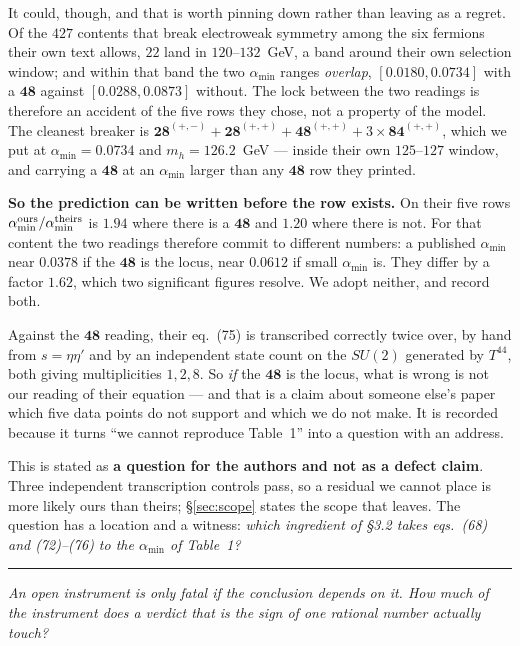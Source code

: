 \documentclass[11pt,a4paper]{article}
\newcommand{\su}[1]{SU(#1)}
\newcommand{\rep}[1]{\mathbf{#1}}
\newcommand{\amin}{\alpha_{\min}}
\newcommand{\bridge}[1]{\par\medskip\noindent
  \textcolor{hdrblue!45}{\rule{2.2cm}{0.6pt}}\;\;\parbox[t]{0.84\textwidth}{\small\itshape
  \textcolor{hdrblue!85}{#1}}\par\medskip}
\newenvironment{keyeq}
  {\begin{center}\setlength{\fboxsep}{9pt}\setlength{\fboxrule}{0.8pt}%
   \begin{lrbox}{\keyeqbox}\begin{minipage}{0.88\textwidth}}
  {\end{minipage}\end{lrbox}%
   \fcolorbox{hdrblue!55}{hdrblue!6}{\usebox{\keyeqbox}}\end{center}}
\begin{document}
It could, though, and that is worth pinning down rather than leaving as a regret. Of the $427$
contents that break electroweak symmetry among the six fermions their own text allows, $22$ land in
$120$--$132$~GeV, a band around their own selection window; and within that band the two $\amin$
ranges \emph{overlap}, $[0.0180,0.0734]$ with a $\rep{48}$ against $[0.0288,0.0873]$ without. The
lock between the two readings is therefore an accident of the five rows they chose, not a property
of the model. The cleanest breaker is
$\rep{28}^{(+,-)}+\rep{28}^{(+,+)}+\rep{48}^{(+,+)}+3\times\rep{84}^{(+,+)}$, which we put at
$\amin=0.0734$ and $m_h=126.2$~GeV --- inside their own $125$--$127$ window, and carrying a
$\rep{48}$ at an $\amin$ larger than any $\rep{48}$ row they printed.

\begin{keyeq}
\textbf{So the prediction can be written before the row exists.} On their five rows
$\amin^{\rm ours}/\amin^{\rm theirs}$ is $1.94$ where there is a $\rep{48}$ and $1.20$ where there is
not. For that content the two readings therefore commit to different numbers: a published $\amin$
near $0.0378$ if the $\rep{48}$ is the locus, near $0.0612$ if small $\amin$ is. They differ by a
factor $1.62$, which two significant figures resolve. We adopt neither, and record both.
\end{keyeq}

\noindent
Against the $\rep{48}$ reading, their eq.~(75) is transcribed correctly twice over, by hand
from $s=\eta\eta'$ and by an independent state count on the $\su2$ generated by $T^{44}$, both giving
multiplicities $1,2,8$. So \emph{if} the $\rep{48}$ is the locus, what is wrong is not our reading of
their equation --- and that is a claim about someone else's paper which five data points do not
support and which we do not make. It is recorded because it turns ``we cannot reproduce Table~1''
into a question with an address.

\begin{keyeq}
This is stated as \textbf{a question for the authors and not as a defect claim}. Three independent
transcription controls pass, so a residual we cannot place is more likely ours than theirs;
\S\ref{sec:scope} states the scope that leaves. The
question has a location and a witness: \emph{which ingredient of \S3.2 takes eqs.~(68) and
(72)--(76) to the $\amin$ of Table~1?}
\end{keyeq}

\bridge{An open instrument is only fatal if the conclusion depends on it. How much of the instrument
does a verdict that is the sign of one rational number actually touch?}
\end{document}
